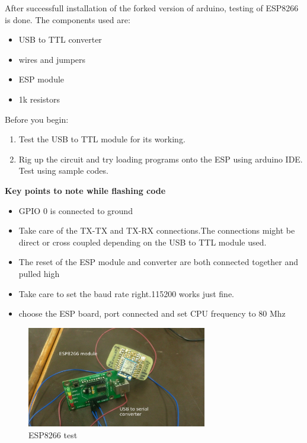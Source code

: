 \documentclass[16pt]{article}
\begin{document}
After successfull installation of the forked version of arduino, testing
of ESP8266 is done. The components used are:

\begin{itemize}

\item
  USB to TTL converter
\item
  wires and jumpers
\item
  ESP module
\item
  1k resistors
\end{itemize}

Before you begin:

\begin{enumerate}

\item
  Test the USB to TTL module for its working.
\item
  Rig up the circuit and try loading programs onto the ESP using arduino
  IDE. Test using sample codes.
\end{enumerate}



\textbf{Key points to note while flashing code}

\begin{itemize}

\item
  GPIO 0 is connected to ground
\item
  Take care of the TX-TX and TX-RX connections.The connections might be
  direct or cross coupled depending on the USB to TTL module used.
\item
  The reset of the ESP module and converter are both connected together
  and pulled high
\item
  Take care to set the baud rate right.115200 works just fine.
\item
  choose the ESP board, port connected and set CPU frequency to 80 Mhz
\end{itemize}

\begin{figure}
\hspace{2cm}
\includegraphics[width=0.7\textwidth]{images/ESP8266.jpg}
\caption{ESP8266 test}
\end{figure}
\end{document}
